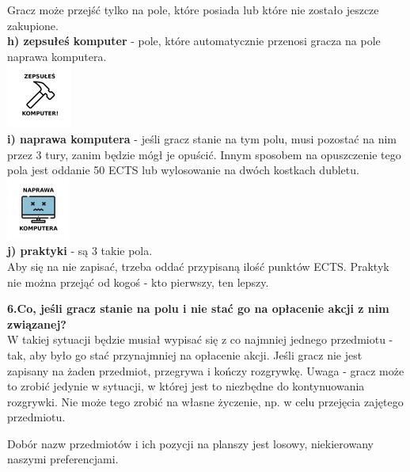 \documentclass[a4paper]{article}
\begin{document}
\indent Gracz może przejść tylko na pole, które posiada lub które nie zostało jeszcze zakupione. \\
\noindent \textbf{h) zepsułeś komputer} - pole, które automatycznie przenosi gracza na pole naprawa komputera.\\
\indent\includegraphics[scale=0.8]{jail.png}\\
\noindent \textbf{i) naprawa komputera} - jeśli gracz stanie na tym polu, musi pozostać na nim przez 3 tury, zanim będzie mógł je opuścić. Innym sposobem na opuszczenie tego pola jest oddanie 50 ECTS lub wylosowanie na dwóch kostkach dubletu.\\
\indent\includegraphics[scale=0.8]{injail.png}\\
\noindent \textbf{j) praktyki} - są 3 takie pola.\\
\indent Aby się na nie zapisać, trzeba oddać przypisaną ilość punktów ECTS. Praktyk nie można przejąć od kogoś - kto pierwszy, ten lepszy.\\ 
\vspace{10pt}

\noindent \textbf{6.Co, jeśli gracz stanie na polu i nie stać go na opłacenie akcji  z nim związanej?}\\
\noindent W takiej sytuacji będzie musiał wypisać się z co najmniej jednego przedmiotu - tak, aby było go stać przynajmniej na opłacenie akcji. Jeśli gracz nie jest zapisany na żaden przedmiot, przegrywa i kończy rozgrywkę. Uwaga - gracz może to zrobić jedynie w sytuacji, w której jest to niezbędne do kontynuowania rozgrywki. Nie może tego zrobić na własne życzenie, np. w celu przejęcia zajętego przedmiotu. 
\vspace{10pt}

\noindent Dobór nazw przedmiotów i ich pozycji na planszy jest losowy, niekierowany naszymi preferencjami.
\end{document}
